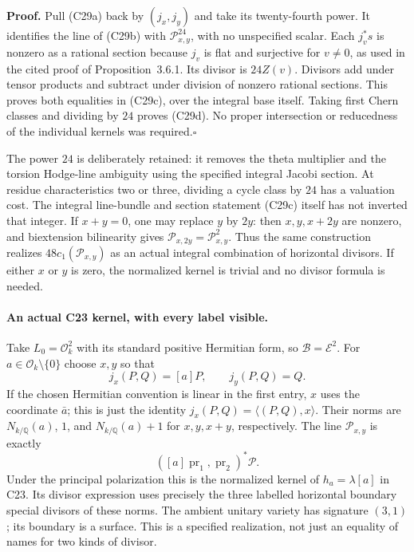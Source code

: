 \documentclass[11pt]{article}
\newcommand{\Q}{\mathbb Q}\newcommand{\C}{\mathbb C}\newcommand{\Z}{\mathbb Z}\newcommand{\R}{\mathbb R}\newcommand{\A}{\mathbb A}\newcommand{\OO}{\mathcal O}
\theoremstyle{definition}\newtheorem{definition}[theorem]{Definition}\newtheorem{remark}[theorem]{Remark}
\begin{document}
\textbf{Proof.}
Pull (C29a) back by $(j_x,j_y)$ and take its twenty-fourth
power. It identifies the line of (C29b) with
$\mathcal P_{x,y}^{24}$, with no unspecified scalar.
Each $j_v^*s$ is nonzero as a rational section because
$j_v$ is flat and surjective for $v\ne0$, as used in
the cited proof of Proposition~3.6.1. Its divisor is
$24Z(v)$. Divisors add under tensor products and subtract
under division of nonzero rational sections. This proves
both equalities in (C29c), over the integral base itself.
Taking first Chern classes and dividing by $24$ proves
(C29d). No proper intersection or reducedness of the
individual kernels was required.\hfill$\square$

The power $24$ is deliberately retained: it removes the
theta multiplier and the torsion Hodge-line ambiguity
using the specified integral Jacobi section. At residue
characteristics two or three, dividing a cycle class by
$24$ has a valuation cost. The integral line-bundle and
section statement (C29c) itself has not inverted that
integer. If $x+y=0$, one may replace $y$ by $2y$:
then $x,y, x+2y$ are nonzero, and biextension bilinearity
gives $\mathcal P_{x,2y}=\mathcal P_{x,y}^2$.
Thus the same construction realizes $48c_1(\mathcal P_{x,y})$
as an actual integral combination of horizontal divisors.
If either $x$ or $y$ is zero, the normalized kernel is
trivial and no divisor formula is needed.

\paragraph{An actual C23 kernel, with every label visible.}
Take $L_0=\mathcal O_k^2$ with its standard positive
Hermitian form, so $\mathcal B=\mathcal E^2$. For
$a\in\mathcal O_k\setminus\{0\}$ choose $x,y$ so that
\[
       j_x(P,Q)=[a]P,\qquad j_y(P,Q)=Q.
\]
If the chosen Hermitian convention is linear in the first
entry, $x$ uses the coordinate $\bar a$; this is just the
identity $j_x(P,Q)=\langle(P,Q),x\rangle$.
Their norms are $N_{k/\Q}(a)$, $1$, and
$N_{k/\Q}(a)+1$ for $x,y,x+y$, respectively.
The line $\mathcal P_{x,y}$ is exactly
\[
                     ([a]\operatorname{pr}_1,
                           \operatorname{pr}_2)^*\mathcal P.
 \tag{C29e}
\]
Under the principal polarization this is the normalized
kernel of $h_a=\lambda[a]$ in C23. Its divisor expression
uses precisely the three labelled horizontal boundary
special divisors of these norms. The ambient unitary
variety has signature $(3,1)$; its boundary is a surface.
This is a specified realization, not just an equality of
names for two kinds of divisor.
\end{document}

